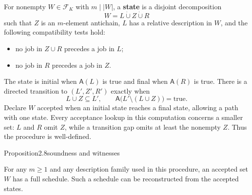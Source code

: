 For nonempty \(W\in\mathcal F_K\) with \(m\mid |W|\), a \textbf{state} is a disjoint decomposition \[
W=L\mathbin{\dot\cup}Z\mathbin{\dot\cup}R
\] such that \(Z\) is an \(m\)-element antichain, \(L\) has a relative description in \(W\), and the following compatibility tests hold:

\begin{itemize}
\tightlist
\item
  no job in \(Z\cup R\) precedes a job in \(L\);
\item
  no job in \(R\) precedes a job in \(Z\).
\end{itemize}

The state is initial when \(\mathsf A(L)\) is true and final when \(\mathsf A(R)\) is true. There is a directed transition to \((L',Z',R')\) exactly when \[
L\cup Z\subseteq L',
\qquad
\mathsf A\bigl(L'\setminus(L\cup Z)\bigr)=\mathrm{true}.
\tag{2.2}
\] Declare \(W\) accepted when an initial state reaches a final state, allowing a path with one state. Every acceptance lookup in this computation concerns a smaller set: \(L\) and \(R\) omit \(Z\), while a transition gap omits at least the nonempty \(Z\). Thus the procedure is well-defined.

\begin{numbered}{Proposition}{2.8}{soundness and witnesses}

For any \(m\geq1\) and any description family used in this procedure, an accepted set \(W\) has a full schedule. Such a schedule can be reconstructed from the accepted states.

\end{numbered}

